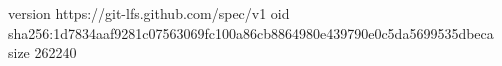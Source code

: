 version https://git-lfs.github.com/spec/v1
oid sha256:1d7834aaf9281c07563069fc100a86cb8864980e439790e0c5da5699535dbeca
size 262240
